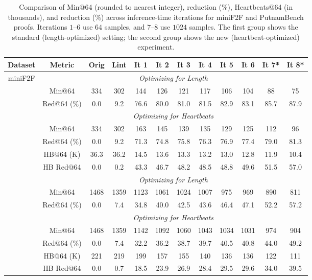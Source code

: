 \begin{table}[H]
\caption{Comparison of Min@64 (rounded to nearest integer), reduction (\%), Heartbeats@64 (in thousands), and reduction (\%) across inference-time iterations for miniF2F and PutnamBench proofs. Iterations $1$–$6$ use $64$ samples, and $7$–$8$ use $1024$ samples. The first group shows the standard (length-optimized) setting; the second group shows the new (heartbeat-optimized) experiment.}
\label{tab:inference-iteration-results-len-hb-comparison}
\centering
\begin{tabular}{c c c c c c c c c c c c}
\toprule
\textbf{Dataset} & \textbf{Metric} & \textbf{Orig} & \textbf{Lint} & \textbf{It 1} & \textbf{It 2} & \textbf{It 3} & \textbf{It 4} & \textbf{It 5} & \textbf{It 6} & \textbf{It 7*} & \textbf{It 8*} \\
\midrule

\multirow{9}{*}{miniF2F}
& \multicolumn{11}{c}{\textit{Optimizing for Length}} \\
& Min@64 & 334 & 302 & 144 & 126 & 121 & 117 & 106 & 104 & 88 & 75 \\
& Red@64 (\%) & 0.0 & 9.2 & 76.6 & 80.0 & 81.0 & 81.5 & 82.9 & 83.1 & 85.7 & 87.9 \\
\cmidrule(lr){2-12}
& \multicolumn{11}{c}{\textit{Optimizing for Heartbeats}} \\
& Min@64 & 334 & 302 & 163 & 145 & 139 & 135 & 129 & 125 & 112 & 96 \\
& Red@64 (\%) & 0.0 & 9.2 & 71.3 & 74.8 & 75.8 & 76.3 & 76.9 & 77.4 & 79.0 & 81.3 \\
& HB@64 (K) & 36.3 & 36.2 & 14.5 & 13.6 & 13.3 & 13.2 & 13.0 & 12.8 & 11.9 & 10.4 \\
& HB Red@64 & 0.0 & 0.2 & 43.3 & 46.7 & 48.2 & 48.5 & 48.8 & 49.6 & 51.5 & 57.0 \\

\midrule

\multirow{9}{*}{Putnam}
& \multicolumn{11}{c}{\textit{Optimizing for Length}} \\
& Min@64 & 1468 & 1359 & 1123 & 1061 & 1024 & 1007 & 975 & 969 & 890 & 811 \\
& Red@64 (\%) & 0.0 & 7.4 & 34.8 & 40.0 & 42.5 & 43.6 & 46.4 & 47.1 & 52.2 & 57.2 \\
\cmidrule(lr){2-12}
& \multicolumn{11}{c}{\textit{Optimizing for Heartbeats}} \\
& Min@64 & 1468 & 1359 & 1142 & 1092 & 1060 & 1043 & 1034 & 1031 & 974 & 904 \\
& Red@64 (\%) & 0.0 & 7.4 & 32.2 & 36.2 & 38.7 & 39.7 & 40.5 & 40.8 & 44.0 & 49.2 \\
& HB@64 (K) & 221 & 219 & 199 & 157 & 155 & 140 & 136 & 136 & 122 & 111  \\
& HB Red@64 & 0.0 & 0.7 & 18.5 & 23.9 & 26.9 & 28.4 & 29.5 & 29.6 & 34.0 & 39.5 \\
\bottomrule
\end{tabular}
\end{table}

